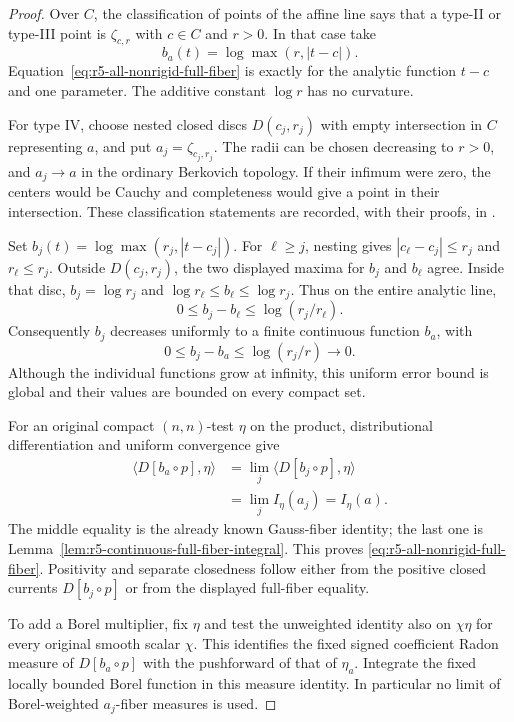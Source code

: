 \documentclass[11pt,a4paper]{article}
\numberwithin{equation}{section}
\theoremstyle{definition}
\theoremstyle{remark}
\begin{document}
\begin{proof}
Over $C$, the classification of points of the affine line says that
a type-II or type-III point is $\zeta_{c,r}$ with $c\in C$ and $r>0$.
In that case take
\[
 b_a(t)=\log\max(r,|t-c|).
\]
Equation~\eqref{eq:r5-all-nonrigid-full-fiber} is exactly
\cite[Corollary 18.6.2, pp.~533--534]{CLD25} for the analytic function
$t-c$ and one parameter.  The additive constant $\log r$ has no
curvature.

For type IV, choose nested closed discs
$D(c_j,r_j)$ with empty intersection in $C$ representing $a$,
and put $a_j=\zeta_{c_j,r_j}$.  The radii can be chosen decreasing
to $r>0$, and $a_j\to a$ in the ordinary Berkovich topology.
If their infimum were zero, the centers would be Cauchy and
completeness would give a point in their intersection.  These
classification statements are recorded, with their proofs, in
\cite[Lemma I.2.11, Proposition I.2.12, and Remark I.2.13,
pp.~8--9]{PT20}.

Set $b_j(t)=\log\max(r_j,|t-c_j|)$.  For $\ell\geq j$, nesting
gives $|c_\ell-c_j|\leq r_j$ and $r_\ell\leq r_j$.  Outside
$D(c_j,r_j)$, the two displayed maxima for $b_j$ and $b_\ell$
agree.  Inside that disc, $b_j=\log r_j$ and
$\log r_\ell\leq b_\ell\leq\log r_j$.  Thus on the entire
analytic line,
\[
 0\leq b_j-b_\ell\leq\log(r_j/r_\ell).
\]
Consequently $b_j$ decreases uniformly to a finite continuous
function $b_a$, with
\begin{equation}\label{eq:r5-type-four-uniform-error}
 0\leq b_j-b_a\leq\log(r_j/r)\longrightarrow0.
\end{equation}
Although the individual functions grow at infinity, this uniform
error bound is global and their values are bounded on every compact
set.

For an original compact $(n,n)$-test $\eta$ on the product,
distributional differentiation and uniform convergence give
\[
 \begin{aligned}
 \langle D[b_a\circ p],\eta\rangle
 &=\lim_j\langle D[b_j\circ p],\eta\rangle\\
 &=\lim_j I_\eta(a_j)=I_\eta(a).
 \end{aligned}
\]
The middle equality is the already known Gauss-fiber identity;
the last one is Lemma~\ref{lem:r5-continuous-full-fiber-integral}.
This proves \eqref{eq:r5-all-nonrigid-full-fiber}.  Positivity and
separate closedness follow either from the positive closed currents
$D[b_j\circ p]$ or from the displayed full-fiber equality.

To add a Borel multiplier, fix $\eta$ and test the unweighted
identity also on $\chi\eta$ for every original smooth scalar
$\chi$.  This identifies the fixed signed coefficient Radon
measure of $D[b_a\circ p]$ with the pushforward of that of
$\eta_a$.  Integrate the fixed locally bounded Borel function in
this measure identity.  In particular no limit of Borel-weighted
$a_j$-fiber measures is used.
\end{proof}
\end{document}
